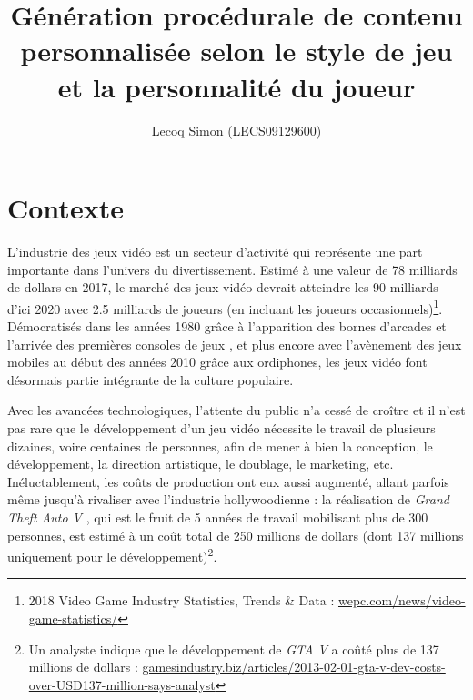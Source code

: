 \documentclass[a4paper,11pt]{article}
\title{Génération procédurale de contenu personnalisée selon le style de jeu et la personnalité du joueur}
\author{Lecoq Simon (LECS09129600)}
\date{}
\begin{document}
    \maketitle
    \setlength{\parskip}{1em}

    \section{Contexte}\label{section:context}
  
      L'industrie des jeux vidéo est un secteur d'activité qui représente une part importante dans l'univers du divertissement.
      Estimé à une valeur de 78 milliards de dollars en 2017, le marché des jeux vidéo devrait atteindre les 90 milliards d'ici 2020 avec 2.5 milliards de joueurs (en incluant les joueurs occasionnels)\footnote{2018 Video Game Industry Statistics, Trends \& Data : \url{wepc.com/news/video-game-statistics/}}.
      Démocratisés dans les années 1980 grâce à l'apparition des bornes d'arcades et l'arrivée des premières consoles de jeux \cite{Wolf}, et plus encore avec l'avènement des jeux mobiles au début des années 2010 grâce aux ordiphones, les jeux vidéo font désormais partie intégrante de la culture populaire.
    
      Avec les avancées technologiques, l'attente du public n'a cessé de croître et il n'est pas rare que le développement d'un jeu vidéo nécessite le travail de plusieurs dizaines, voire centaines de personnes, afin de mener à bien la conception, le développement, la direction artistique, le doublage, le marketing, etc.
      Inéluctablement, les coûts de production ont eux aussi augmenté, allant parfois même jusqu'à rivaliser avec l'industrie hollywoodienne : 
      la réalisation de \textit{Grand Theft Auto V} \cite{game:GTAV}, qui est le fruit de 5 années de travail mobilisant plus de 300 personnes, est estimé à un coût total de 250 millions de dollars (dont 137 millions uniquement pour le développement)\footnote{Un analyste indique que le développement de \textit{GTA V} a coûté plus de 137 millions de dollars : \url{gamesindustry.biz/articles/2013-02-01-gta-v-dev-costs-over-USD137-million-says-analyst}}.
\end{document}
